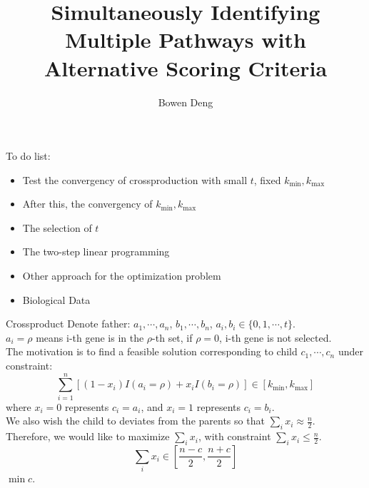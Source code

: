 \documentclass[xcolor=dvipsnames]{beamer}
\begin{document}
\title{Simultaneously Identifying Multiple Pathways with Alternative Scoring Criteria}
\author{Bowen Deng}
\date{}
\begin{frame}
\maketitle
\end{frame}
\begin{frame}
To do list:\\
\begin{itemize}
\item Test the convergency of crossproduction with small $t$, fixed $k_{\min},k_{\max}$\\
\item After this, the convergency of $k_{\min},k_{\max}$\\
\item The selection of $t$\\
\item The two-step linear programming\\
\item Other approach for the optimization problem\\
\item Biological Data\\
\end{itemize}
\end{frame}
\begin{frame}{Crossproduct}
Denote father: $a_1,\cdots,a_n$, $b_1,\cdots,b_n$, $a_i,b_i\in\{0,1,\cdots,t\}$.\\
$a_i=\rho$ means i-th gene is in the $\rho$-th set, if $\rho=0$, i-th gene is not selected.\\
The motivation is to find a feasible solution corresponding to child $c_1,\cdots,c_n$ under constraint:\\
\[
\sum_{i=1}^n[(1-x_i)I(a_i=\rho)+x_iI(b_i=\rho)]\in[k_{\min},k_{\max}]
\]
where $x_i=0$ represents $c_i=a_i$, and $x_i=1$ represents $c_i=b_i$.\\
We also wish the child to deviates from the parents so that $\sum_ix_i\approx \frac{n}{2}$.\\
Therefore, we would like to maximize $\sum_ix_i$, with constraint $\sum_ix_i\leqslant \frac{n}{2}$.\\
\[
\sum_{i}x_i\in[\frac{n-c}{2},\frac{n+c}{2}]
\]
$\min c$.\\
\end{frame}
\end{document}
